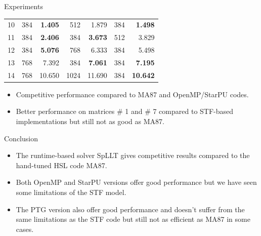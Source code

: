 \documentclass{beamer}
\newcommand{\db}[1]{\textcolor{mblue}{#1\xspace}}
\newcommand{\dd}[1]{\textcolor{gray!70}{#1\xspace}}
\begin{document}
\begin{frame}{Experiments}
\begin{center}
{{\begin{tabular}{r|rr|rr|rr}
        10 & 384                               & \bf \dd{1.405}             & 512  & \dd{1.879}     & 384 & \bf \dd{1.498}  \\
        11 & 384                               & \bf \dd{2.406}             & 384  & \bf \dd{3.673} & 512 & \dd{3.829}      \\
        12 & 384                               & \bf \dd{5.076}             & 768  & \dd{6.333}     & 384 & \dd{5.498}      \\
        13 & 768                               & \dd{7.392}                 & 384  & \bf \dd{7.061} & 384 & \bf \dd{7.195}  \\
        14 & 768                               & \dd{10.650}                & 1024 & \dd{11.690}     & 384 & \bf \dd{10.642} \\
        \hline
    \end{tabular}}}
  \end{center}
  \begin{itemize}
  \item Competitive performance compared to MA87 and OpenMP/StarPU
    codes.
  \item Better performance on matrices \# 1 and \# 7 compared to
    STF-based implementations but still not as good as MA87.
  \end{itemize}
\end{frame}

\begin{frame}{Conclusion}
  \begin{itemize}
  \item The \alert{runtime-based} solver \db{SpLLT} gives competitive
    results compared to the \db{hand-tuned HSL code MA87}.

    \vspace{0.4cm}

  \item Both \alert{OpenMP} and \alert{StarPU} versions offer good
    performance but we have seen some limitations of the \db{STF
      model}.

    \vspace{0.4cm}

  \item The \alert{PTG} version also offer good performance and
    doesn't suffer from the same limitations as the \alert{STF} code
    but still not as efficient as MA87 in some cases.
  \end{itemize}
\end{frame}
\end{document}
